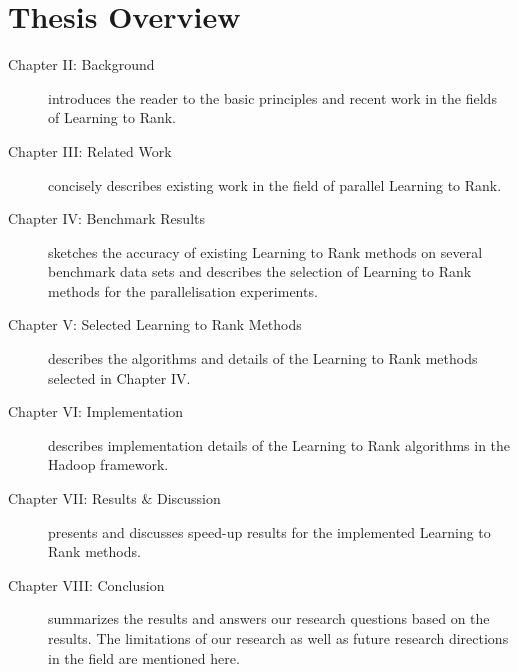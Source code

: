 \section{Thesis Overview}

\begin{description}
\item[Chapter II: Background]{introduces the reader to the basic principles and recent work in the fields of Learning to Rank.}
\item[Chapter III: Related Work]{concisely describes existing work in the field of parallel Learning to Rank.}
\item[Chapter IV: Benchmark Results]{sketches the accuracy of existing Learning to Rank methods on several benchmark data sets and describes the selection of Learning to Rank methods for the parallelisation experiments.}
\item[Chapter V: Selected Learning to Rank Methods]{describes the algorithms and details of the Learning to Rank methods selected in Chapter IV.}
\item[Chapter VI: Implementation]{describes implementation details of the Learning to Rank algorithms in the Hadoop framework.}
\item[Chapter VII: Results \& Discussion]{presents and discusses speed-up results for the implemented Learning to Rank methods.}
\item[Chapter VIII: Conclusion]{summarizes the results and answers our research questions based on the results. The limitations of our research as well as future research directions in the field are mentioned here.}
\end{description}